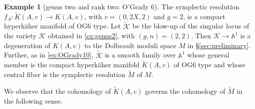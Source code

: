 \documentclass[JEP,XML,SOM,Unicode, NoEqCountersInSection,NoFloatCountersInSection,published]{cedram}
\let\mathcal\mathscr
\theoremstyle{definition}
\newtheorem{exa}[thm]{Example}
\newcommand{\Aff}{\mathbb{A}}
\begin{document}
\begin{exa}[genus two and rank two: O'Grady 6]
The symplectic resolution $f_A \colon \widetilde{K}(A,v) \to K(A,v)$, with $v=(0,2X,2)$ and $g=2$, is a compact hyperkäher manifold of OG6 type. Let $\widetilde{\mathcal{K}}$ be the blow-up of the singular locus of the variety $\mathcal{K}$ obtained in \cref{ex:genus2}, with $(g,n)=(2,2)$. Then $\mathcal{K} \to \Aff^1$ is a degeneration of $K(A,v)$ to the Dolbeault moduli space $M$ in \S \ref{sec:preliminary}. Further, as in \cref{ex:OGrady10}, $\widetilde{\mathcal{K}}$ is a smooth family over $\Aff^1$ whose general member is the compact hyperkäher manifold $\widetilde{K}(A,v)$ of OG6 type and whose central fiber is the symplectic resolution $\widetilde{M}$ of $M$.

We observe that the cohomology of $\widetilde{K}(A,v)$ governs the cohomology of $\widetilde{M}$ in the following sense.


\end{exa}
\end{document}

